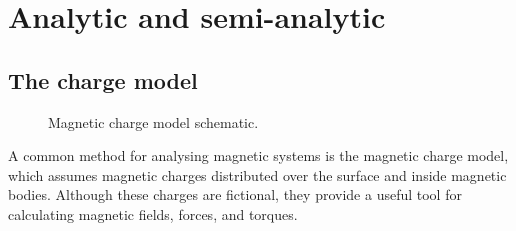 \section{Analytic and semi-analytic}

\subsection{The charge model}

\begin{figure}
    \centering
    \vspace{5cm}
    \caption{Magnetic charge model schematic.}
    \label{fig:chargeModelSchematic}
\end{figure}

A common method for analysing magnetic systems is the magnetic charge model, which assumes magnetic charges distributed over the surface and inside magnetic bodies. Although these charges are fictional, they provide a useful tool for calculating magnetic fields, forces, and torques.

